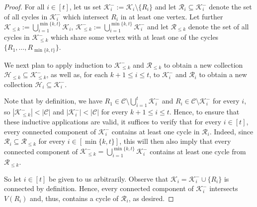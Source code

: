 \documentclass[11pt,reqno]{article}
\begin{document}
\begin{proof}
    For all $i\in [t]$, let us set $\mathcal K_i^-:= \mathcal K_i\setminus \{R_i\}$ and let $\mathcal R_i\subseteq \mathcal K_i^-$ denote the set of all cycles in $\mathcal{K}_i^-$ which intersect $R_i$ in at least one vertex. Let further $\mathcal K_{\leq k}:=\bigcup_{i=1}^{\min\{k,t\}} \mathcal K_i$, $\mathcal K_{\leq k}^-:=\bigcup_{i=1}^{\min\{k,t\}}\mathcal K_i^-$ and let $\mathcal R_{\leq k}$ denote the set of all cycles in $\mathcal{K}_{\le k}^-$ which share some vertex with at least one of the cycles $\{R_1,\ldots,R_{\min\{k,t\}}\}$.

    We next plan to apply induction to $\mathcal K_{\leq k}^-$ and $\mathcal R_{\leq k}$ to obtain a new collection $\mathcal H_{\leq k}\subseteq \mathcal K_{\le k}^-$, as well as, for each $k+1\leq i\leq t$, to $\mathcal K_i^-$ and $\mathcal R_i$ to obtain a new collection $\mathcal H_i\subseteq \mathcal K_i^-$. 

    Note that by definition, we have $R_1 \in \mathcal C \setminus \bigcup_{i=1}^{t}\mathcal K_i^-$ and $R_i\in \mathcal C\setminus \mathcal K_i^-$ for every $i$, so $|\mathcal{K}_{\le k}^-|<|\mathcal C|$ and $|\mathcal{K}_i^-|<|\mathcal{C}|$ for every $k+1\le i \le t$. Hence, to ensure that these inductive applications are valid, it suffices to verify that for every $i\in [t]$, every connected component of $\mathcal{K}_i^-$ contains at least one cycle in $\mathcal R_i$. Indeed, since $\mathcal{R}_i\subseteq \mathcal{R}_{\le k}$ for every $i\in [\min\{k,t\}]$, this will then also imply that every connected component of $\mathcal{K}_{\le k}^-=\bigcup_{i=1}^{\min\{k,t\}}\mathcal{K}_i^-$ contains at least one cycle from $\mathcal{R}_{\le k}$. 

   So let $i\in [t]$ be given to us arbitrarily. Observe that $\mathcal K_i=\mathcal K_i^-\cup \{R_i\}$ is connected by definition. Hence, every connected component of $\mathcal K_i^-$ intersects $V(R_i)$ and, thus, contains a cycle of $\mathcal R_i$, as desired. 


\end{proof}
\end{document}
